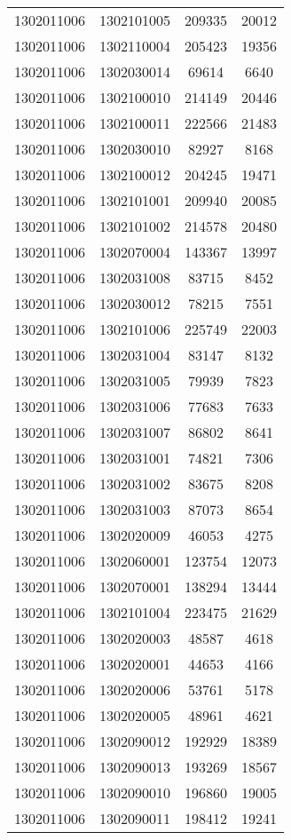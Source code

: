 \begin{longtable}{llcc}
1302011006 & 1302101005 & 209335 & 20012\\
1302011006 & 1302110004 & 205423 & 19356\\
1302011006 & 1302030014 & 69614 & 6640\\
1302011006 & 1302100010 & 214149 & 20446\\
1302011006 & 1302100011 & 222566 & 21483\\
1302011006 & 1302030010 & 82927 & 8168\\
1302011006 & 1302100012 & 204245 & 19471\\
1302011006 & 1302101001 & 209940 & 20085\\
1302011006 & 1302101002 & 214578 & 20480\\
1302011006 & 1302070004 & 143367 & 13997\\
1302011006 & 1302031008 & 83715 & 8452\\
1302011006 & 1302030012 & 78215 & 7551\\
1302011006 & 1302101006 & 225749 & 22003\\
1302011006 & 1302031004 & 83147 & 8132\\
1302011006 & 1302031005 & 79939 & 7823\\
1302011006 & 1302031006 & 77683 & 7633\\
1302011006 & 1302031007 & 86802 & 8641\\
1302011006 & 1302031001 & 74821 & 7306\\
1302011006 & 1302031002 & 83675 & 8208\\
1302011006 & 1302031003 & 87073 & 8654\\
1302011006 & 1302020009 & 46053 & 4275\\
1302011006 & 1302060001 & 123754 & 12073\\
1302011006 & 1302070001 & 138294 & 13444\\
1302011006 & 1302101004 & 223475 & 21629\\
1302011006 & 1302020003 & 48587 & 4618\\
1302011006 & 1302020001 & 44653 & 4166\\
1302011006 & 1302020006 & 53761 & 5178\\
1302011006 & 1302020005 & 48961 & 4621\\
1302011006 & 1302090012 & 192929 & 18389\\
1302011006 & 1302090013 & 193269 & 18567\\
1302011006 & 1302090010 & 196860 & 19005\\
1302011006 & 1302090011 & 198412 & 19241\\

\end{longtable}
